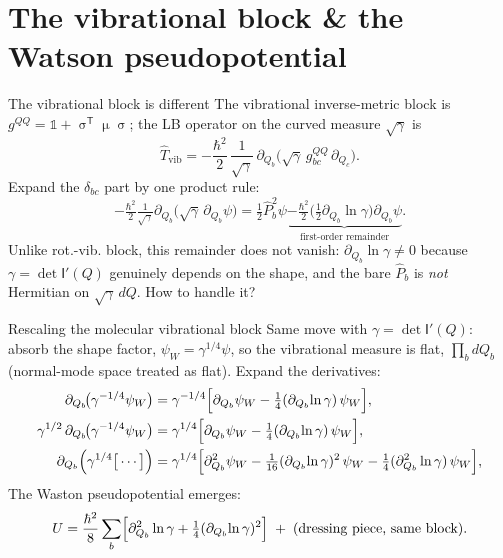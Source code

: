 \documentclass[aspectratio=169,10pt]{beamer}
\newcommand{\Mmu}{\upmu}        %
\newcommand{\Msig}{\upsigma}    %
\newcommand{\stagenum}{0}
\newcommand{\setstage}[1]{\renewcommand{\stagenum}{#1}}
\begin{document}
\section{The vibrational block \& the Watson pseudopotential}

\begin{frame}{The vibrational block is different}
\setstage{3}
The vibrational inverse-metric block is $g^{QQ}=\mathbb 1+\Msig^{\mathsf T}\Mmu\Msig$; the LB operator on the curved measure $\sqrt\gamma$ is
\begin{equation*}
\hat T_{\mathrm{vib}}=-\frac{\hbar^2}{2}\,\frac{1}{\sqrt\gamma}\,\partial_{Q_b}\!\bigl(\sqrt\gamma\,g^{QQ}_{bc}\,\partial_{Q_c}\bigr).
\end{equation*}
Expand the $\delta_{bc}$ part by one product rule:
\begin{equation*}
-\tfrac{\hbar^2}{2}\tfrac{1}{\sqrt\gamma}\partial_{Q_b}\!\bigl(\sqrt\gamma\,\partial_{Q_b}\psi\bigr)=\tfrac12\hat P_b^2\psi
\underbrace{-\tfrac{\hbar^2}{2}\bigl(\tfrac12\partial_{Q_b}\!\ln\gamma\bigr)\partial_{Q_b}\psi}_{\text{first-order remainder}} .
\end{equation*}
\alert{Unlike rot.-vib. block, this remainder does not vanish}: $\partial_{Q_b}\ln\gamma\ne0$ because $\gamma=\det\mathsf I'(Q)$ genuinely depends on the shape, and the bare $\hat P_b$ is \emph{not} Hermitian on $\sqrt\gamma\,dQ$. How to handle it?
\end{frame}

\begin{frame}{Rescaling the molecular vibrational block}
\setstage{3}
\footnotesize
Same move with $\gamma=\det\mathsf I'(Q)$: absorb the shape factor, $\psi_W=\gamma^{1/4}\psi$, so the vibrational measure is flat, $\prod_b dQ_b$ (normal-mode space treated as flat). Expand the derivatives:
\begin{align*}
\partial_{Q_b}\!\bigl(\gamma^{-1/4}\psi_W\bigr)&=\gamma^{-1/4}\Bigl[\partial_{Q_b}\psi_W-\tfrac14(\partial_{Q_b}\!\ln\gamma)\,\psi_W\Bigr],\\
\gamma^{1/2}\,\partial_{Q_b}\!\bigl(\gamma^{-1/4}\psi_W\bigr)&=\gamma^{1/4}\Bigl[\partial_{Q_b}\psi_W-\tfrac14(\partial_{Q_b}\!\ln\gamma)\,\psi_W\Bigr],\\
\partial_{Q_b}\Bigl(\gamma^{1/4}\bigl[\,\cdots\,\bigr]\Bigr)&=\gamma^{1/4}\Bigl[\partial_{Q_b}^{2}\psi_W-\tfrac{1}{16}(\partial_{Q_b}\!\ln\gamma)^{2}\,\psi_W-\tfrac14(\partial_{Q_b}^{2}\ln\gamma)\,\psi_W\Bigr],
\end{align*}
The Waston pseudopotential emerges:
\begin{equation*}
U=\frac{\hbar^2}{8}\sum_b\Bigl[\partial_{Q_b}^2\ln\gamma+\tfrac14(\partial_{Q_b}\!\ln\gamma)^2\Bigr]\;+\;(\text{dressing piece, same block}).
\end{equation*}
\end{frame}
\end{document}
